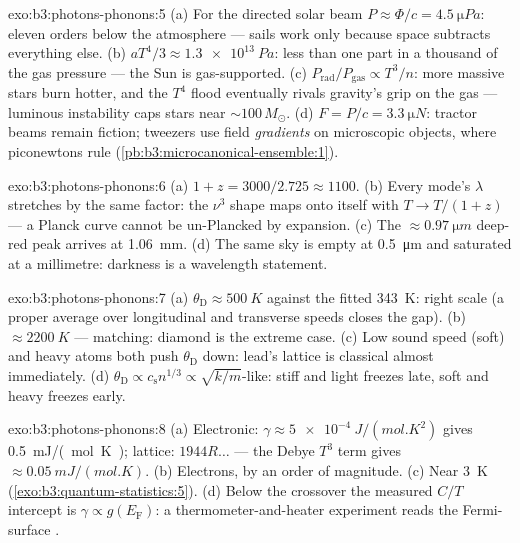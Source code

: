 \begin{solution}{exo:b3:photons-phonons:5}
(a) For the directed solar beam $P \approx \Phi/c =
\qty{4.5}{\micro Pa}$: eleven orders below the atmosphere ---
sails work only because space subtracts everything else. (b)
$aT^4/3 \approx \qty{1.3e13}{Pa}$: less than one part in a
thousand of the gas pressure --- the Sun is gas-supported. (c)
$P_{\text{rad}}/P_{\text{gas}} \propto T^3/n$: more massive stars
burn hotter, and the $T^4$ flood eventually rivals gravity's
grip on the gas --- luminous instability caps stars near
$\sim100\,M_\odot$. (d) $F = P/c = \qty{3.3}{\micro N}$:
tractor beams remain fiction; tweezers use field \emph{gradients}
on microscopic objects, where piconewtons rule
(\cref{pb:b3:microcanonical-ensemble:1}).
\end{solution}

\begin{solution}{exo:b3:photons-phonons:6}
(a) $1 + z = 3000/2.725 \approx 1100$. (b) Every mode's $\lambda$
stretches by the same factor: the $\nu^3$ shape maps onto itself
with $T \to T/(1+z)$ --- a Planck curve cannot be un-Plancked by
expansion. (c) The $\approx\qty{0.97}{\micro m}$ deep-red peak
arrives at \qty{1.06}{mm}. (d) The same sky is empty at
\qty{0.5}{\micro m} and saturated at a millimetre: darkness is a
wavelength statement.
\end{solution}

\begin{solution}{exo:b3:photons-phonons:7}
(a) $\theta_{\text{D}} \approx \qty{500}{K}$ against the fitted
\qty{343}{K}: right scale (a proper average over longitudinal and
transverse speeds closes the gap). (b) $\approx\qty{2200}{K}$ ---
matching: diamond is the extreme case. (c) Low sound speed (soft)
and heavy atoms both push $\theta_{\text{D}}$ down: lead's lattice
is classical almost immediately. (d) $\theta_{\text{D}} \propto
c_{\text{s}}n^{1/3} \propto \sqrt{k/m}$-like: stiff and light
freezes late, soft and heavy freezes early.
\end{solution}

\begin{solution}{exo:b3:photons-phonons:8}
(a) Electronic: $\gamma \approx \qty{5e-4}{J/(mol.K^2)}$ gives
\qty{0.5}{mJ/(mol.K)}; lattice: $1944R\dots$ --- the Debye $T^3$
term gives $\approx\qty{0.05}{mJ/(mol.K)}$. (b) Electrons, by an
order of magnitude. (c) Near \qty{3}{K}
(\cref{exo:b3:quantum-statistics:5}). (d) Below the crossover the
measured $C/T$ intercept is $\gamma \propto g(E_{\text{F}})$: a
thermometer-and-heater experiment reads the Fermi-surface .
\end{solution}

